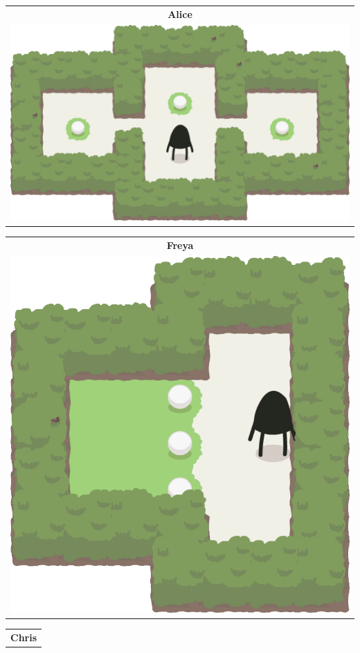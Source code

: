 \documentclass{report}
\theoremstyle{plain}
\begin{document}
\begin{center}
\begin{tabular}{c}
\end{tabular}
\begin{tabular}{c}
\textbf{Alice} \\
\includegraphics[scale=\levelAnnexWidth]{alice-1.png}
\end{tabular}
\begin{tabular}{c}
\textbf{Freya} \\
\includegraphics[scale=\levelAnnexWidth]{freya-1.png}
\end{tabular}
\begin{tabular}{c}
\textbf{Chris} \\

\end{tabular}
\end{center}
\end{document}
